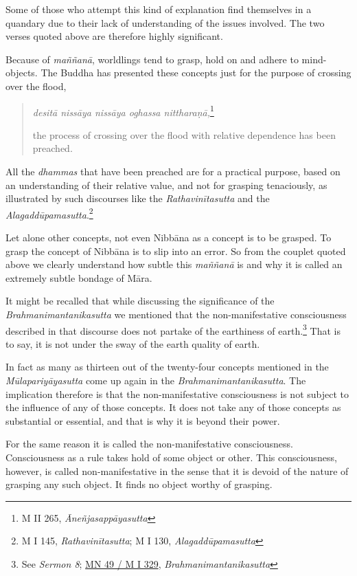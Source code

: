 Some of those who attempt this kind of explanation find themselves in a quandary due to their lack of understanding of the issues involved. The two verses quoted above are therefore highly significant.

Because of \emph{maññanā}, worldlings tend to grasp, hold on and adhere to mind-objects. The Buddha has presented these concepts just for the purpose of crossing over the flood,

\begin{quote}
\emph{desitā nissāya nissāya oghassa nittharaṇā,}\footnote{M II 265, \emph{Āneñjasappāyasutta}}

the process of crossing over the flood with relative dependence has been preached.
\end{quote}

All the \emph{dhammas} that have been preached are for a practical purpose, based on an understanding of their relative value, and not for grasping tenaciously, as illustrated by such discourses like the \emph{Rathavinītasutta} and the \emph{Alagaddūpamasutta}.\footnote{M I 145, \emph{Rathavinītasutta}; M I 130, \emph{Alagaddūpamasutta}}

Let alone other concepts, not even Nibbāna as a concept is to be grasped. To grasp the concept of Nibbāna is to slip into an error. So from the couplet quoted above we clearly understand how subtle this \emph{maññanā} is and why it is called an extremely subtle bondage of Māra.

It might be recalled that while discussing the significance of the \emph{Brahmanimantanikasutta} we mentioned that the non-manifestative consciousness described in that discourse does not partake of the earthiness of earth.\footnote{See \emph{Sermon 8}; \href{https://suttacentral.net/mn49/pli/ms}{MN 49 / M I 329}, \emph{Brahmanimantanikasutta}} That is to say, it is not under the sway of the earth quality of earth.

In fact as many as thirteen out of the twenty-four concepts mentioned in the \emph{Mūlapariyāyasutta} come up again in the \emph{Brahmanimantanikasutta}. The implication therefore is that the non-manifestative consciousness is not subject to the influence of any of those concepts. It does not take any of those concepts as substantial or essential, and that is why it is beyond their power.

For the same reason it is called the non-manifestative consciousness. Consciousness as a rule takes hold of some object or other. This consciousness, however, is called non-manifestative in the sense that it is devoid of the nature of grasping any such object. It finds no object worthy of grasping.

